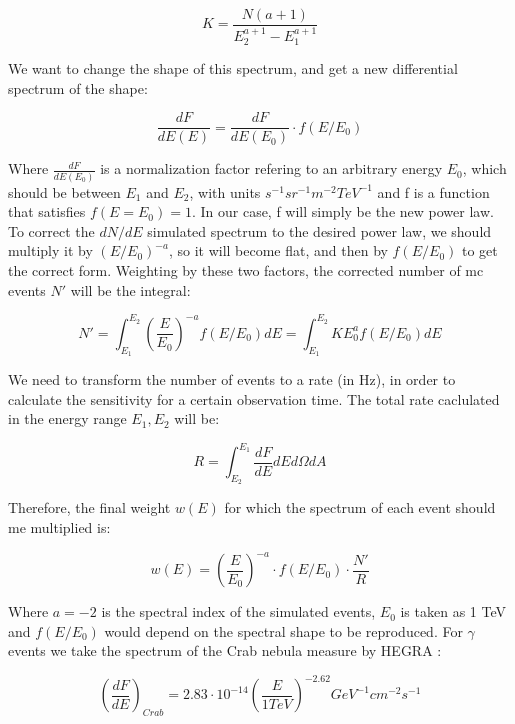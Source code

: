\documentclass[main.tex]{subfiles}
\begin{document}
\begin{equation}
  K = \frac{N(a+1)}{E_{2}^{a+1}-E_{1}^{a+1}}
\end{equation}

We want to change the shape of this spectrum, and get a new differential spectrum of the shape:

\begin{equation}
  \frac{dF}{dE(E)} = \frac{dF}{dE(E_0)}\cdot f(E/E_0)
\end{equation}

Where $\frac{dF}{dE(E_0)}$ is a normalization factor refering to an arbitrary energy $E_0$, which should be between $E_{1}$ and $E_{2}$, with units $s^{-1}sr^{-1}m^{-2}TeV^{-1}$ and f is a function that satisfies $f(E=E_{0}) = 1$. In our case, f will simply be the new power law. To correct the $dN/dE$  simulated spectrum to the desired power law, we should multiply it by $(E/E_{0})^{-a}$, so it will become flat, and then by $f(E/E_{0})$ to get the correct form. Weighting by these two factors, the corrected number of \gls{mc} events $N'$ will be the integral:

\begin{equation}
  N' = \int^{E_{2}}_{E_{1}} \left(\frac{E}{E_{0}}\right)^{-a} f(E/E_{0}) dE = \int^{E_{2}}_{E_{1}} KE_{0}^{a}f(E/E_{0})dE
\end{equation}

We need to transform the number of events to a rate (in Hz), in order to calculate the sensitivity for a certain observation time. The total rate caclulated in the energy range $E_{1}, E_{2}$ will be:

\begin{equation}
  R = \int^{E_{1}}_{E_{2}} \frac{dF}{dE}dE d\Omega dA
\end{equation}

Therefore, the final weight $w(E)$ for which the spectrum of each event should me multiplied is:

\begin{equation}
  w(E) = \left(\frac{E}{E_0}\right)^{-a}\cdot f(E/E_{0}) \cdot \frac{N'}{R}
\end{equation}

Where $a=-2$ is the spectral index of the simulated events, $E_{0}$ is taken as 1 TeV and $f(E/E_{0})$ would depend on the spectral shape to be reproduced. For $\gamma$ events we take the spectrum of the Crab nebula measure by HEGRA \cite{2004CrabHEGRA}:

\begin{equation}
  \left(\frac{dF}{dE}\right)_{Crab} = 2.83\cdot 10^{-14} \left(\frac{E}{1 TeV}\right)^{-2.62} GeV^{-1}cm^{-2}s^{-1}
\end{equation}
\end{document}
